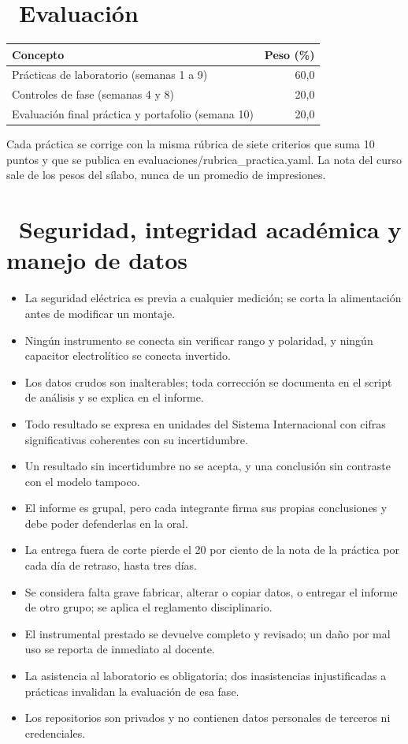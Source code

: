 \documentclass[11pt,a4paper]{article}
\newcommand{\iconotexto}[2]{\textcolor{cyanNeon}{\faIcon{#1}}~#2}
\begin{document}
\section{\iconotexto{clipboard-check}{Evaluación}}

\begin{tabularx}{\linewidth}{@{}X r@{}}
\toprule
Concepto & Peso (\%)\\
\midrule
Prácticas de laboratorio (semanas 1 a 9) & 60,0 \\
Controles de fase (semanas 4 y 8) & 20,0 \\
Evaluación final práctica y portafolio (semana 10) & 20,0 \\
\bottomrule
\end{tabularx}

Cada práctica se corrige con la misma rúbrica de siete criterios que suma 10 puntos y que se publica en evaluaciones/rubrica\_practica.yaml. La nota del curso sale de los pesos del sílabo, nunca de un promedio de impresiones.

\section{\iconotexto{balance-scale}{Seguridad, integridad académica y manejo de datos}}

\begin{itemize}[leftmargin=1.4em,itemsep=2pt,topsep=3pt]
  \item La seguridad eléctrica es previa a cualquier medición; se corta la alimentación antes de modificar un montaje.
  \item Ningún instrumento se conecta sin verificar rango y polaridad, y ningún capacitor electrolítico se conecta invertido.
  \item Los datos crudos son inalterables; toda corrección se documenta en el script de análisis y se explica en el informe.
  \item Todo resultado se expresa en unidades del Sistema Internacional con cifras significativas coherentes con su incertidumbre.
  \item Un resultado sin incertidumbre no se acepta, y una conclusión sin contraste con el modelo tampoco.
  \item El informe es grupal, pero cada integrante firma sus propias conclusiones y debe poder defenderlas en la oral.
  \item La entrega fuera de corte pierde el 20 por ciento de la nota de la práctica por cada día de retraso, hasta tres días.
  \item Se considera falta grave fabricar, alterar o copiar datos, o entregar el informe de otro grupo; se aplica el reglamento disciplinario.
  \item El instrumental prestado se devuelve completo y revisado; un daño por mal uso se reporta de inmediato al docente.
  \item La asistencia al laboratorio es obligatoria; dos inasistencias injustificadas a prácticas invalidan la evaluación de esa fase.
  \item Los repositorios son privados y no contienen datos personales de terceros ni credenciales.
\end{itemize}
\end{document}
